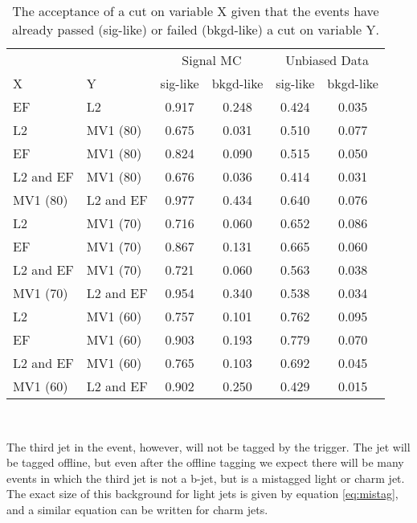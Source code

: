   \begin{table}[hbt]

    \begin{tabular}{l | l | c | c || c | c }
    \multicolumn{2}{c}{}  & \multicolumn{2}{c}{Signal MC} & \multicolumn{2}{c}{Unbiased Data} \\
      X         & Y         & sig-like & bkgd-like   &   sig-like & bkgd-like \\
      \hline
      EF        & L2        & 0.917    & 0.248 &   0.424       & 0.035 \\
      \hline
      L2        & MV1 (80)  & 0.675    & 0.031 &       0.510       & 0.077 \\
      EF        & MV1 (80)  & 0.824    & 0.090 & 0.515       & 0.050\\
      L2 and EF & MV1 (80)  & 0.676    & 0.036 & 0.414       & 0.031 \\
      MV1 (80)  & L2 and EF & 0.977    & 0.434 & 0.640       & 0.076 \\
      \hline
      L2        & MV1 (70)  & 0.716    & 0.060 & 0.652       & 0.086\\
      EF        & MV1 (70)  & 0.867    & 0.131 & 0.665       & 0.060 \\
      L2 and EF & MV1 (70)  & 0.721    & 0.060 & 0.563       & 0.038\\
      MV1 (70)  & L2 and EF & 0.954    & 0.340 & 0.538       & 0.034\\
      \hline
      L2        & MV1 (60)  & 0.757    & 0.101 & 0.762       & 0.095\\
      EF        & MV1 (60)  & 0.903    & 0.193 & 0.779       & 0.070 \\
      L2 and EF & MV1 (60)  & 0.765    & 0.103 & 0.692       & 0.045\\
      MV1 (60)  & L2 and EF & 0.902    & 0.250 & 0.429       & 0.015\\
    \end{tabular}
    \\
    \vspace{2mm}

\caption{  The acceptance of a cut on variable X given that the events have
  already passed (sig-like) or failed (bkgd-like) a cut on variable Y.}
  \end{table}
  


The third jet in the event, however, will not be tagged by the trigger.  The jet will be tagged offline, but even after the offline tagging we expect there will be many events in which the third jet is not a b-jet, but is a mistagged light or charm jet.  The exact size of this background for light jets is given by equation \ref{eq:mistag}, and a similar equation can be written for charm jets.

